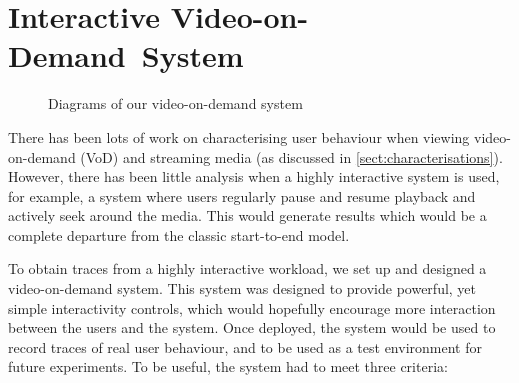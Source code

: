 \chapter{Interactive Video-on-Demand~System}
\label{chap:experiment}

\begin{figure}[t]
    \centering


    \caption{Diagrams of our video-on-demand system}
    \label{fig:system}
\end{figure}

There has been lots of work on characterising user behaviour when viewing video-on-demand (VoD) and streaming media (as discussed in \autoref{sect:characterisations}). However, there has been little analysis when a highly interactive system is used, for example, a system where users regularly pause and resume playback and actively seek around the media. This would generate results which would be a complete departure from the classic start-to-end model.

To obtain traces from a highly interactive workload, we set up and designed a video-on-demand system. This system was designed to provide powerful, yet simple interactivity controls, which would hopefully encourage more interaction between the users and the system. Once deployed, the system would be used to record traces of real user behaviour, and to be used as a test environment for future experiments. To be useful, the system had to meet three criteria:

